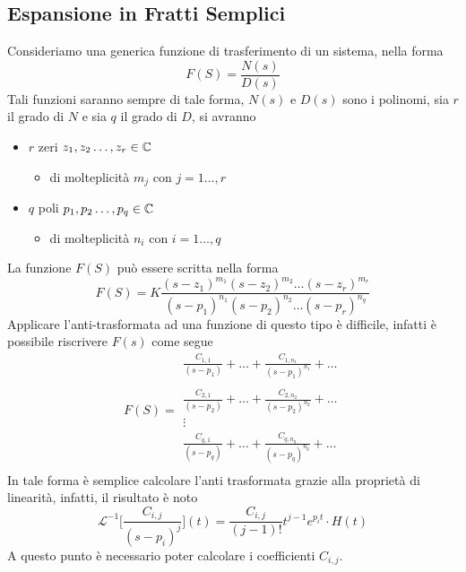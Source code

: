 \documentclass[10pt, letterpaper]{report}
\begin{document}
\subsection{Espansione in Fratti Semplici}
Consideriamo una generica funzione di trasferimento di un sistema, nella forma 
$$ F(S)=\frac{N(s)}{D(s)}$$
Tali funzioni saranno sempre di tale forma, $N(s)$ e $D(s)$ sono i polinomi, sia 
$r$ il grado di $N$ e sia $q$ il grado di $D$, si avranno\begin{itemize}
    \item $r$ zeri $z_1,z_2\dots,z_r\in{\mathbb C}$\begin{itemize}
        \item di molteplicità $m_j$ con $j=1\dots, r$
    \end{itemize}
    \item $q$ poli $p_1,p_2\dots,p_q\in{\mathbb C}$\begin{itemize}
        \item di molteplicità $n_i$ con $i=1\dots, q$
    \end{itemize}
 \end{itemize}
La funzione $F(S)$ può essere scritta nella forma 
$$ F(S)=K\frac{(s-z_1)^{m_1}(s-z_2)^{m_2}\dots (s-z_r)^{m_r}}{(s-p_1)^{n_1}(s-p_2)^{n_2}\dots (s-p_r)^{n_q}}$$
Applicare l'anti-trasformata ad una funzione di questo tipo è difficile, infatti è possibile 
riscrivere $F(s)$ come segue 
$$ F(S)=\begin{matrix}\displaystyle
    \frac{C_{1,1}}{(s-p_1)}+\dots+\frac{C_{1,{n_1}}}{(s-p_1)^{n_1}}+\dots \\ \\
    \displaystyle\frac{C_{2,1}}{(s-p_2)}+\dots+\frac{C_{2,{n_2}}}{(s-p_2)^{n_2}}+\dots \\ 
    \vdots \\ 
    \displaystyle\frac{C_{q,1}}{(s-p_q)}+\dots+\frac{C_{q,{n_q}}}{(s-p_q)^{n_q}}+\dots \\ 
\end{matrix}$$
In tale forma è semplice calcolare l'anti trasformata grazie alla proprietà di linearità, infatti, il 
risultato è noto 
$$ \mathcal{L}^{-1}\Bigg[\frac{C_{i,j}}{(s-p_i)^j}\Bigg](t)=\frac{C_{i,j}}{(j-1)!}t^{j-1}e^{p_it}\cdot H(t)$$
A questo punto è necessario poter calcolare i coefficienti $C_{i,j}$.
\flowerLine 
\end{document}
